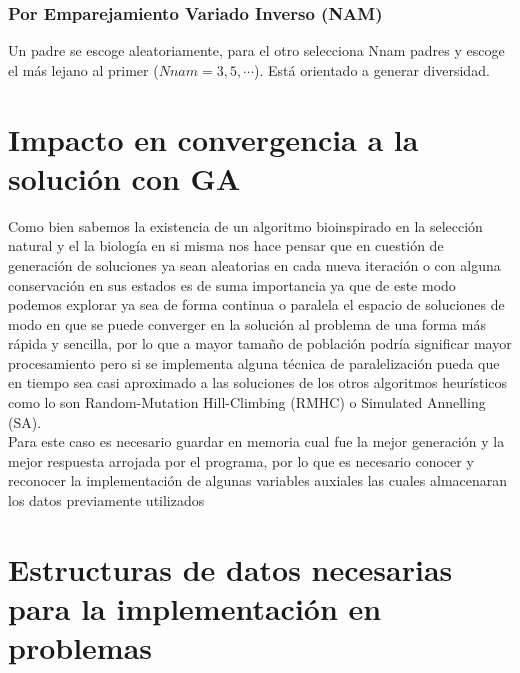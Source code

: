 \documentclass[10pt]{article}
\begin{document}
\subsubsection{Por Emparejamiento Variado Inverso (NAM)}
Un padre se escoge aleatoriamente, para el otro selecciona Nnam padres y escoge el más lejano al primer (\(\displaystyle Nnam=3,5,\cdots\)). Está orientado a generar diversidad.
\section{Impacto en convergencia a la solución con GA}
Como bien sabemos la existencia de un algoritmo bioinspirado en la selección natural y el la biología en si misma nos hace pensar que en cuestión de generación de soluciones ya sean aleatorias en cada nueva iteración o con alguna conservación en sus estados es de suma importancia ya que de este modo podemos explorar ya sea de forma continua o paralela el espacio de soluciones de modo en que se puede converger en la solución al problema de una forma más rápida y sencilla, por lo que a mayor tamaño de población podría significar mayor procesamiento pero si se implementa alguna técnica de paralelización pueda que en tiempo sea casi aproximado a las soluciones de los otros algoritmos heurísticos como lo son Random-Mutation Hill-Climbing (RMHC) o Simulated Annelling (SA).\\
Para este caso es necesario guardar en memoria cual fue la mejor generación y la mejor respuesta arrojada por el programa, por lo que es necesario conocer y reconocer la implementación de algunas variables auxiales las cuales almacenaran los datos previamente utilizados


\section{Estructuras de datos necesarias para la implementación en problemas}
\end{document}
